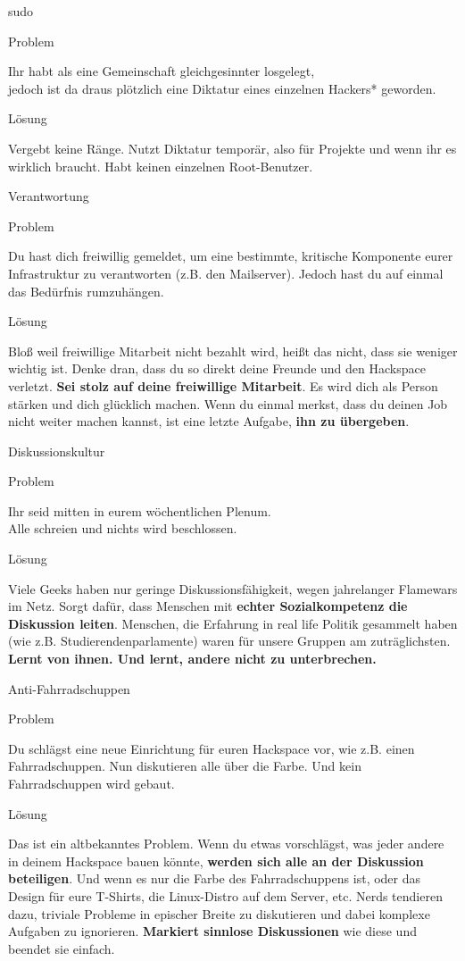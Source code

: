 \documentclass[aspectratio=1610]{beamer}
\newcommand{\pattern}[2]{
  \begin{alertblock}{Problem}
    #1
  \end{alertblock}
  \pause
  \begin{exampleblock}{Lösung}
    #2
  \end{exampleblock}
}
\begin{document}
  \begin{frame}{sudo}
    \pattern{
      Ihr habt als eine Gemeinschaft gleichgesinnter losgelegt,\\
      jedoch ist da draus plötzlich eine Diktatur eines einzelnen Hackers* geworden.
    }{
      Vergebt keine Ränge. Nutzt Diktatur temporär, also für Projekte und wenn
      ihr es wirklich braucht. Habt keinen einzelnen Root-Benutzer.
    }
  \end{frame}

  \begin{frame}{Verantwortung}
    \pattern{
      Du hast dich freiwillig gemeldet, um eine bestimmte, kritische Komponente
      eurer Infrastruktur zu verantworten (z.B. den Mailserver). Jedoch hast du
      auf einmal das Bedürfnis rumzuhängen.
    }{
      Bloß weil freiwillige Mitarbeit nicht bezahlt wird, heißt das nicht, dass
      sie weniger wichtig ist. Denke dran, dass du so direkt deine Freunde und
      den Hackspace verletzt. \textbf{Sei stolz auf deine freiwillige
      Mitarbeit}. Es wird dich als Person stärken und dich glücklich machen.
      Wenn du einmal merkst, dass du deinen Job nicht weiter machen kannst, ist
      eine letzte Aufgabe, \textbf{ihn zu übergeben}.
    }
  \end{frame}

  \begin{frame}{Diskussionskultur}
    \pattern{
      Ihr seid mitten in eurem wöchentlichen Plenum.\\
      Alle schreien und nichts wird beschlossen.
    }{
      Viele Geeks haben nur geringe Diskussionsfähigkeit, wegen jahrelanger Flamewars
      im Netz. Sorgt dafür, dass Menschen mit \textbf{echter Sozialkompetenz die
      Diskussion leiten}. Menschen, die Erfahrung in real life Politik gesammelt
      haben (wie z.B. Studierendenparlamente) waren für unsere Gruppen am
      zuträglichsten. \textbf{Lernt von ihnen. Und lernt, andere nicht zu
      unterbrechen.}
    }
  \end{frame}

  \begin{frame}{Anti-Fahrradschuppen}
    \pattern{
      Du schlägst eine neue Einrichtung für euren Hackspace vor, wie z.B.
      einen Fahrradschuppen. Nun diskutieren alle über die Farbe. Und kein
      Fahrradschuppen wird gebaut.
    }{
      Das ist ein altbekanntes Problem. Wenn du etwas vorschlägst, was jeder
      andere in deinem Hackspace bauen könnte, \textbf{werden sich alle an der
      Diskussion beteiligen}. Und wenn es nur die Farbe des Fahrradschuppens
      ist, oder das Design für eure T-Shirts, die Linux-Distro auf dem Server,
      etc. Nerds tendieren dazu, triviale Probleme in epischer Breite zu
      diskutieren und dabei komplexe Aufgaben zu ignorieren. \textbf{Markiert
      sinnlose Diskussionen} wie diese und beendet sie einfach.
    }
  \end{frame}
\end{document}
